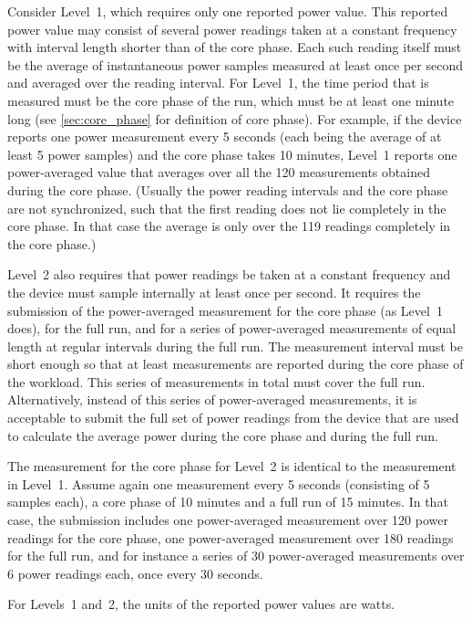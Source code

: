 \noindent
Consider Level~1, which requires only one reported power value.
This reported power value may consist of several power readings taken at a constant frequency with interval length shorter than \MaxReadingIntervalCorePhaseLTwoThree{} of the core phase.
Each such reading itself must be the average of instantaneous power samples measured at least once per second and averaged over the reading interval.
For Level~1, the time period that is measured must be the core phase of the run, which must be at least one minute long (see \ref{sec:core_phase} for definition of core phase).
For example, if the device reports one power measurement every 5 seconds (each being the average of at least 5 power samples) and the core phase takes 10 minutes, Level~1 reports one power-averaged value that averages over all the 120 measurements obtained during the core phase.
(Usually the power reading intervals and the core phase are not synchronized, such that the first reading does not lie completely in the core phase.
In that case the average is only over the 119 readings completely in the core phase.)
\wl

\noindent
Level~2 also requires that power readings be taken at a constant frequency and the device must sample internally at least once per second.
It requires the submission of the power-averaged measurement for the core phase (as Level~1 does), for the full run, and for a series of power-averaged measurements of equal length at regular intervals during the full run.
The measurement interval must be short enough so that at least \MinMeasurementsCorePhaseLTwoThree{} measurements are reported during the core phase of the workload.
This series of measurements in total must cover the full run.
Alternatively, instead of this series of power-averaged measurements, it is acceptable to submit the full set of power readings from the device that are used to calculate the average power during the core phase and during the full run.
\wl

\noindent
The measurement for the core phase for Level~2 is identical to the measurement in Level~1.
Assume again one measurement every 5 seconds (consisting of 5 samples each), a core phase of 10 minutes and a full run of 15 minutes.
In that case, the submission includes one power-averaged measurement over 120 power readings for the core phase, one power-averaged measurement over 180 readings for the full run, and for instance a series of 30 power-averaged measurements over 6 power readings each, once every 30 seconds.
\wl

\noindent
For Levels~1 and~2, the units of the reported power values are watts.
\wl

